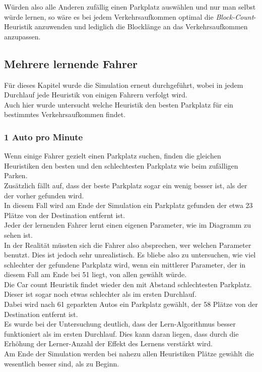 Würden also alle Anderen zufällig einen Parkplatz auswählen und nur man selbst würde lernen, so wäre es bei jedem Verkehrsaufkommen optimal die \emph{Block-Count}-Heuristik anzuwenden und lediglich die Blocklänge an das Verkehrsaufkommen anzupassen. 

\subsection{Mehrere lernende Fahrer}

Für dieses Kapitel wurde die Simulation erneut durchgeführt, wobei in jedem Durchlauf jede Heuristik von einigen Fahrern verfolgt wird. \\
Auch hier wurde untersucht welche Heuristik den besten Parkplatz für ein bestimmtes Verkehrsaufkommen findet.

\subsubsection{1 Auto pro Minute}

Wenn einige Fahrer gezielt einen Parkplatz suchen, finden die gleichen Heuristiken den besten und den schlechtesten Parkplatz wie beim zufälligen Parken.\\
Zusätzlich fällt auf, dass der beste Parkplatz sogar ein wenig besser ist, als der der vorher gefunden wird.\\
In diesem Fall wird am Ende der Simulation ein Parkplatz gefunden der etwa 23 Plätze von der Destination entfernt ist.\\
Jeder der lernenden Fahrer lernt einen eigenen Parameter, wie im Diagramm zu sehen ist.\\
In der Realität müssten sich die Fahrer also absprechen, wer welchen Parameter benutzt. Dies ist jedoch sehr unrealistisch. Es bliebe also zu untersuchen, wie viel schlechter der gefundene Parkplatz wird, wenn ein mittlerer Parameter, der in diesem Fall am Ende bei 51 liegt, von allen gewählt würde.\\
Die Car count Heuristik findet wieder den mit Abstand schlechtesten Parkplatz. Dieser ist sogar noch etwas schlechter als im ersten Durchlauf.\\
Dabei wird nach 61 geparkten Autos ein Parkplatz gewählt, der 58 Plätze von der Destination entfernt ist.\\

Es wurde bei der Untersuchung deutlich, dass der Lern-Algorithmus besser funktioniert als im ersten Durchlauf. Dies kann daran liegen, dass durch die Erhöhung der Lerner-Anzahl der Effekt des Lernens verstärkt wird.\\
Am Ende der Simulation werden bei nahezu allen Heuristiken Plätze gewählt die wesentlich besser sind, als zu Beginn.

